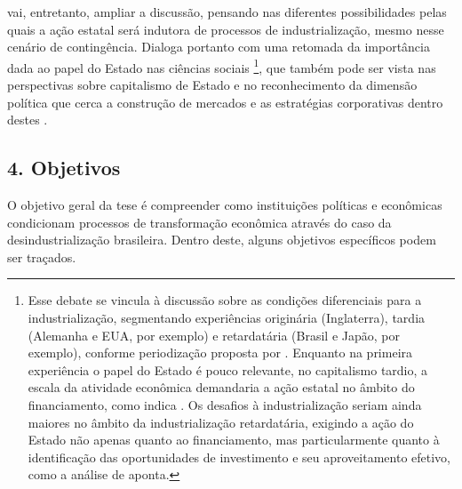 \citet{evans_embedded_1995} vai,
entretanto, ampliar a discussão, pensando nas diferentes possibilidades
pelas quais a ação estatal será indutora de processos de
industrialização, mesmo nesse cenário de contingência. Dialoga portanto
com uma retomada da importância dada ao papel do Estado nas ciências
sociais \citep{evans_bringing_1985}\footnote{Esse debate se vincula à
  discussão sobre as condições diferenciais para a industrialização,
  segmentando experiências originária (Inglaterra), tardia (Alemanha e
  EUA, por exemplo) e retardatária (Brasil e Japão, por exemplo),
  conforme periodização proposta por \citet{mello_o_1982}. Enquanto na
  primeira experiência o papel do Estado é pouco relevante, no
  capitalismo tardio, a escala da atividade econômica demandaria a ação
  estatal no âmbito do financiamento, como indica
  \citet{gerschenkron1962}. Os desafios
  à industrialização seriam ainda maiores no âmbito da industrialização
  retardatária, exigindo a ação do Estado não apenas quanto ao
  financiamento, mas particularmente quanto à identificação das
  oportunidades de investimento e seu aproveitamento efetivo, como a
  análise de \citet{hirschman1958} aponta.},
que também pode ser vista nas perspectivas sobre capitalismo de Estado
\citep{allenwoodkeller2022} e no reconhecimento da dimensão política que cerca a construção
de mercados e as estratégias corporativas dentro destes
\citep{fligstein1996}.

\subsection{4. Objetivos}\label{objetivos}

O objetivo geral da tese é compreender como instituições políticas e
econômicas condicionam processos de transformação econômica através do
caso da desindustrialização brasileira. Dentro deste, alguns objetivos
específicos podem ser traçados.

